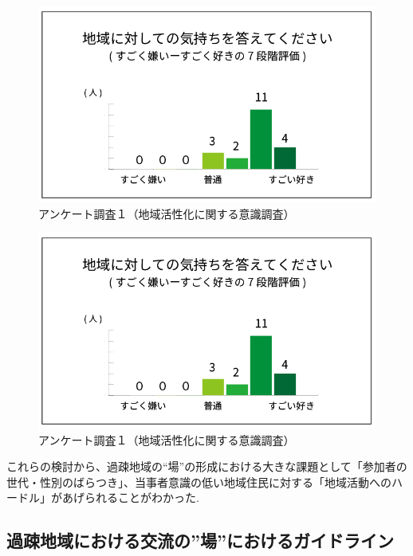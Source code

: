 \documentclass[a4paper]{jsarticle}
\begin{document}
\begin{figure}[H]
  \begin{center}
    \includegraphics[width=0.95\hsize]{./images/03.png}
    \caption{アンケート調査１（地域活性化に関する意識調査）}
    \label{fig:tmu_hino}
  \end{center}
\end{figure}
\begin{figure}[H]
  \begin{center}
    \includegraphics[width=0.95\hsize]{./images/03.png}
    \caption{アンケート調査１（地域活性化に関する意識調査）}
    \label{fig:tmu_hino}
  \end{center}
\end{figure}


これらの検討から、過疎地域の“場”の形成における大きな課題として「参加者の世代・性別のばらつき」、当事者意識の低い地域住民に対する「地域活動へのハードル」があげられることがわかった.



\subsection{過疎地域における交流の”場”におけるガイドライン}
\end{document}
